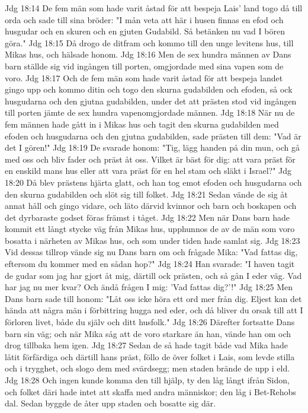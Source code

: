 Jdg 18:14  De fem män som hade varit åstad för att bespeja Lais' land togo då till orda och sade till sina bröder: "I mån veta att här i husen finnas en efod och husgudar och en skuren och en gjuten Gudabild. Så betänken nu vad I bören göra."
Jdg 18:15  Då drogo de ditfram och kommo till den unge levitens hus, till Mikas hus, och hälsade honom.
Jdg 18:16  Men de sex hundra männen av Dans barn ställde sig vid ingången till porten, omgjordade med sina vapen som de voro.
Jdg 18:17  Och de fem män som hade varit åstad för att bespeja landet gingo upp och kommo ditin och togo den skurna gudabilden och efoden, så ock husgudarna och den gjutna gudabilden, under det att prästen stod vid ingången till porten jämte de sex hundra vapenomgjordade männen.
Jdg 18:18  När nu de fem männen hade gått in i Mikas hus och tagit den skurna gudabilden med efoden och husgudarna och den gjutna gudabilden, sade prästen till dem: "Vad är det I gören!"
Jdg 18:19  De svarade honom: "Tig, lägg handen på din mun, och gå med oss och bliv fader och präst åt oss. Vilket är bäst för dig: att vara präst för en enskild mans hus eller att vara präst för en hel stam och släkt i Israel?"
Jdg 18:20  Då blev prästens hjärta glatt, och han tog emot efoden och husgudarna och den skurna gudabilden och slöt sig till folket.
Jdg 18:21  Sedan vände de sig åt annat håll och gingo vidare, och läto därvid kvinnor och barn och boskapen och det dyrbaraste godset föras främst i tåget.
Jdg 18:22  Men när Dans barn hade kommit ett långt stycke väg från Mikas hus, upphunnos de av de män som voro bosatta i närheten av Mikas hus, och som under tiden hade samlat sig.
Jdg 18:23  Vid dessas tillrop vände sig nu Dans barn om och frågade Mika: "Vad fattas dig, eftersom du kommer med en sådan hop?"
Jdg 18:24  Han svarade: "I haven tagit de gudar som jag har gjort åt mig, därtill ock prästen, och så gån I eder väg. Vad har jag nu mer kvar? Och ändå frågen I mig: 'Vad fattas dig?'!"
Jdg 18:25  Men Dans barn sade till honom: "Låt oss icke höra ett ord mer från dig. Eljest kan det hända att några män i förbittring hugga ned eder, och då bliver du orsak till att I förloren livet, både du själv och ditt husfolk."
Jdg 18:26  Därefter fortsatte Dans barn sin väg; och när Mika såg att de voro starkare än han, vände han om och drog tillbaka hem igen.
Jdg 18:27  Sedan de så hade tagit både vad Mika hade låtit förfärdiga och därtill hans präst, föllo de över folket i Lais, som levde stilla och i trygghet, och slogo dem med svärdsegg; men staden brände de upp i eld.
Jdg 18:28  Och ingen kunde komma den till hjälp, ty den låg långt ifrån Sidon, och folket däri hade intet att skaffa med andra människor; den låg i Bet-Rehobs dal. Sedan byggde de åter upp staden och bosatte sig där.

